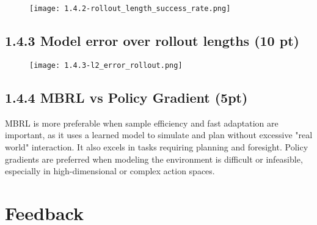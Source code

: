 \documentclass[12pt]{article}
\begin{document}
\begin{tcolorbox}[fit,height=30em, width=40em, blank, borderline={1pt}{1pt},nobeforeafter]
\begin{center}
     \begin{figure}[H]
        \centering
        \texttt{[image: 1.4.2-rollout\_length\_success\_rate.png]}
        \label{fig:placeholder}
    \end{figure}
\end{center}
\end{tcolorbox}

\subsection*{1.4.3 Model error over rollout lengths (10 pt)}

\begin{tcolorbox}[fit,height=30em, width=40em, blank, borderline={1pt}{1pt},nobeforeafter]
\begin{center}
     \begin{figure}[H]
        \centering
        \texttt{[image: 1.4.3-l2\_error\_rollout.png]}
        \label{fig:placeholder}
    \end{figure}
\end{center}
\end{tcolorbox}

\subsection*{1.4.4 MBRL vs Policy Gradient (5pt)}

\begin{tcolorbox}[fit,height=30em, width=40em, blank, borderline={1pt}{1pt},nobeforeafter, valign=center]
\begin{center}
    MBRL is more preferable when sample efficiency and fast adaptation are important, as it uses a learned model to simulate and plan without excessive "real world" interaction. It also excels in tasks requiring planning and foresight. Policy gradients are preferred when modeling the environment is difficult or infeasible, especially in high-dimensional or complex action spaces.
\end{center}
\end{tcolorbox}

\clearpage
\section*{Feedback}
\end{document}
